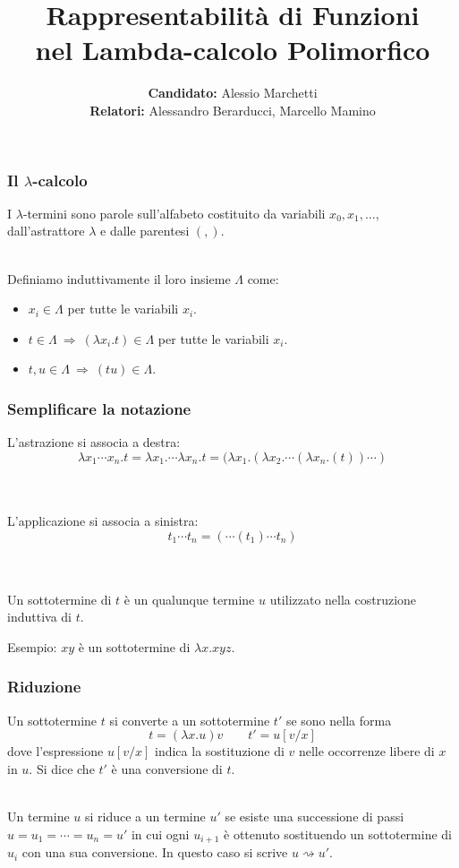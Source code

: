 \documentclass[aspectratio=43]{beamer}
\title[Lambda-calcolo Polimorfico]{Rappresentabilit\`a di Funzioni \\nel Lambda-calcolo
    Polimorfico}
\author[Alessio Marchetti]{\textbf{Candidato:} Alessio Marchetti \\ \textbf{Relatori:} Alessandro
Berarducci, Marcello Mamino}
\date{}
\newcommand{\conv}{\rightsquigarrow}
\begin{document}
\frame{\titlepage}

\begin{frame}
    \frametitle{Il $\lambda$-calcolo} I $\lambda$-termini sono parole
    sull'alfabeto costituito da variabili $x_0, x_1, \dots$, dall'astrattore
    $\lambda$ e dalle parentesi $(,)$. 
\\~\

    Definiamo induttivamente il loro insieme $\Lambda$ come:
    \begin{itemize}
        \item $x_i \in \Lambda$ per tutte le variabili $x_i$.
        \item $t\in \Lambda\ \Rightarrow\ (\lambda x_i.t)\in\Lambda$ per tutte
            le variabili $x_i$.
        \item $t,u\in \Lambda\ \Rightarrow\ (tu)\in \Lambda$.
    \end{itemize}
\end{frame}

\begin{frame}
    \frametitle{Semplificare la notazione}
    L'astrazione si associa a destra:
    \[
        \lambda x_1\cdots x_n.t = \lambda x_1. \cdots \lambda x_n.t = (\lambda
        x_1.(\lambda x_2.\cdots (\lambda x_n.(t))\cdots)
    \]
    \\~\

    L'applicazione si associa a sinistra:
    \[
        t_1\cdots t_n = (\cdots(t_1)\cdots t_n) 
    \]
    \\~\
    
    Un sottotermine di $t$ \`e un qualunque termine $u$ utilizzato nella
    costruzione induttiva di $t$. 

    Esempio: $xy$ \`e un sottotermine di $\lambda x. xyz$.
\end{frame}

\begin{frame}
    \frametitle{Riduzione}
    Un sottotermine $t$ si converte a un sottotermine $t'$ se sono nella forma
    \[
        t = (\lambda x. u)v \qquad t' = u[v/x]
    \]
    dove l'espressione $u[v/x]$ indica la sostituzione di $v$ nelle occorrenze
    libere di
    $x$ in $u$. Si dice che $t'$ \`e una conversione di $t$.
    \\~\

    Un termine $u$ si riduce a un termine $u'$ se esiste una successione di
    passi $u = u_1 = \cdots = u_n = u'$ in cui ogni $u_{i+1}$ \`e ottenuto
    sostituendo un sottotermine di $u_i$ con una sua conversione. In questo caso
    si scrive $u \conv u'$.
\end{frame}
\end{document}
